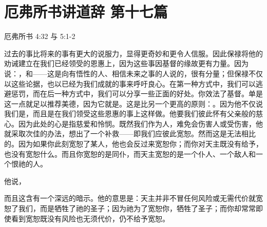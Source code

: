 

\section{厄弗所书讲道辞 第十七篇}

厄弗所书 4:32 与 5:1-2\par

\par

过去的事比将来的事有更大的说服力，显得更奇妙和更令人信服。因此保禄将他的劝诫建立在我们已经领受的恩惠上，因为这些事因基督的缘故更有力量。因为说：，和——这是向有悟性的人、相信未来之事的人说的，很有分量；但保禄不仅以这些论据，也以已经为我们成就的事来呼吁良心。在第一种方式中，我们可以逃避惩罚，而在后一种方式中，我们可以分享一些正面的好处。你效法了基督。单是这一点就足以推荐美德，因为它就是。这是比另一个更高的原则：。因为他不仅说我们是，而且是在我们领受这些恩惠的事上这样做。他要我们彼此怀有父亲般的慈心。因为此处的心是指慈爱和怜悯。既然我们作为人，难免会伤害人或受伤害，他就采取次佳的办法，想出了一个补救——即我们应彼此宽恕。然而这是无法相比的。因为如果你此刻宽恕了某人，他也会反过来宽恕你；而你对天主既没有给予，也没有宽恕什么。而且你宽恕的是同仆，而天主宽恕的是一个仆人、一个敌人和一个恨祂的人。\par

他说，\par

而且这含有一个深远的暗示。他的意思是：天主并非不冒任何风险或无需代价就宽恕了我们，而是牺牲了祂的圣子；因为祂为了宽恕你，牺牲了圣子；而你却常常即使看到宽恕既没有风险也无须代价，仍不给予宽恕。\par

\par

